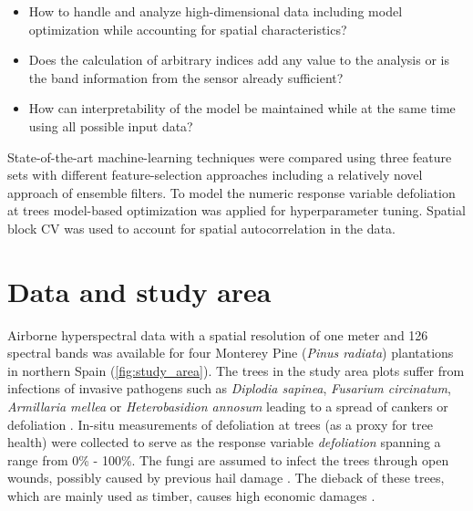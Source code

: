 \documentclass[review]{elsarticle}
\begin{document}
\begin{itemize}
	\item How to handle and analyze high-dimensional data including model optimization while accounting for spatial characteristics?
	\item Does the calculation of arbitrary indices add any value to the analysis or is the band information from the sensor already sufficient?
	\item How can interpretability of the model be maintained while at the same time using all possible input data?
\end{itemize}

\noindent State-of-the-art machine-learning techniques were compared using three feature sets with different feature-selection approaches including a relatively novel approach of ensemble filters.
To model the numeric response variable defoliation at trees model-based optimization was applied for hyperparameter tuning.
Spatial block \ac{CV} was used to account for spatial autocorrelation in the data.

\section{Data and study area}
\noindent Airborne hyperspectral data with a spatial resolution of one meter and 126 spectral bands was available for four Monterey Pine (\textit{Pinus radiata}) plantations in northern Spain (\autoref{fig:study_area}).
The trees in the study area plots suffer from infections of invasive pathogens such as \textit{Diplodia sapinea}, \textit{Fusarium circinatum}, \textit{Armillaria mellea} or \textit{Heterobasidion annosum} leading to a spread of cankers or defoliation \citep{mesanza2016, iturritxa2017}.
In-situ measurements of defoliation at trees (as a proxy for tree health) were collected to serve as the response variable \textit{defoliation} spanning a range from 0\% - 100\%.
The fungi are assumed to infect the trees through open wounds, possibly caused by previous hail damage \citep{iturritxa2014}.
The dieback of these trees, which are mainly used as timber, causes high economic damages \citep{ganley2009}.

\end{document}
